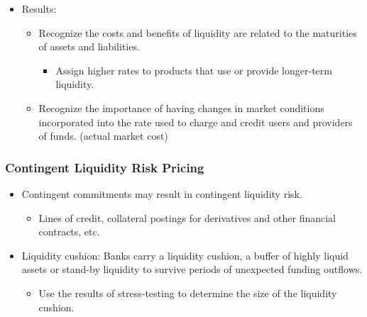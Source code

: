 \begin{itemize}
\begin{itemize}
      \item Results:
        \begin{itemize}
        \item Recognize the costs and benefits of liquidity are related to the maturities of assets and liabilities.
            \begin{itemize}
            \item Assign higher rates to products that use or provide longer-term liquidity.
            \end{itemize}
        \item Recognize the importance of having changes in market conditions incorporated into the rate used to charge and credit users and providers of funds. (actual market cost)
        \end{itemize}
    \end{itemize}
\end{itemize}

\subsubsection{Contingent Liquidity Risk Pricing}

\begin{itemize}
  \item Contingent commitments may result in contingent liquidity risk.
    \begin{itemize}
    \item Lines of credit, collateral postings for derivatives and other financial contracts, etc.
    \end{itemize}
  \item Liquidity cushion: Banks carry a liquidity cushion, a buffer of highly liquid assets or stand-by liquidity to survive periods of unexpected funding outflows.
    \begin{itemize}
    \item Use the results of stress-testing to determine the size of the liquidity cushion.
    \end{itemize}
    
\end{itemize}





